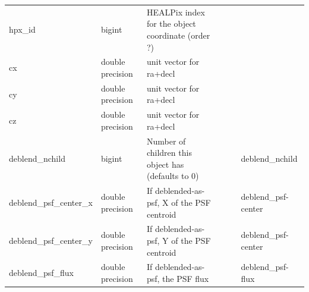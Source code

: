 \documentclass[12pt]{article}
\begin{document}
\begin{table}[thbp]
\begin{center}
{\begin{tabular}{llllll}
hpx\_id & bigint & HEALPix index for the object coordinate (order ?)           &                        &             &   \\
cx & double precision & unit vector for ra+decl                                     &                        &             &   \\
cy & double precision & unit vector for ra+decl                                     &                        &             &   \\
cz & double precision & unit vector for ra+decl                                     &                        &             &   \\
deblend\_nchild & bigint & Number of children this object has (defaults to 0)          &                        &             & deblend\_nchild \\
deblend\_psf\_center\_x & double precision & If deblended-as-psf, X of the PSF centroid                  &                        &             & deblend\_psf-center \\
deblend\_psf\_center\_y & double precision & If deblended-as-psf, Y of the PSF centroid                  &                        &             & deblend\_psf-center \\
deblend\_psf\_flux & double precision & If deblended-as-psf, the PSF flux                           &                        &             & deblend\_psf-flux \\

\end{tabular}}
\end{center}
\end{table}
\end{document}
